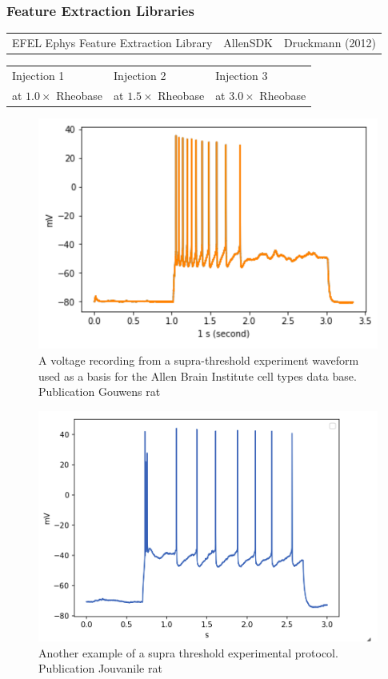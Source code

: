 \subsubsection{Feature Extraction Libraries}
\begin{table}
\centering
\begin{tabular}{lll}
{} EFEL Ephys Feature Extraction Library & AllenSDK & Druckmann (2012) 
\end{tabular}
\end{table}




\begin{tabular}{lll}
{} Injection 1 & Injection 2 & Injection 3 \\
 at $1.0 \times$ Rheobase & at $1.5 \times$ Rheobase & at $3.0 \times$ Rheobase 
\end{tabular}




\begin{figure}
    \begin{center}
    \includegraphics[width=0.6\linewidth]{figures/multi_spiking_large_allen}
    \caption{A voltage recording from a supra-threshold experiment waveform used as a basis for the Allen Brain Institute cell types data base. Publication Gouwens rat \cite{gouwens2018systematic}}
    \label{fig:adaptionm}
    \end{center}
\end{figure}    

\begin{figure}  
    \begin{center}
    \includegraphics[width=0.6\linewidth]{figures/multi_spiking_large_bbp}
    \caption{Another example of a supra threshold experimental protocol. Publication Jouvanile rat \cite{toledo}}
    \label{fig:bbp_trace_adaption_late_spike}
    \end{center}
\end{figure}    


